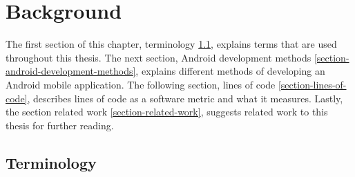 \chapter{Background}\label{chapter-background}
The first section of this chapter, terminology \ref{section-terminology}, explains terms that are used throughout this thesis. The next section, Android development methods \ref{section-android-development-methods}, explains different methods of developing an Android mobile application. The following section, lines of code \ref{section-lines-of-code}, describes lines of code as a software metric and what it measures. Lastly, the section related work \ref{section-related-work}, suggests related work to this thesis for further reading. 

\section{Terminology}\label{section-terminology}
